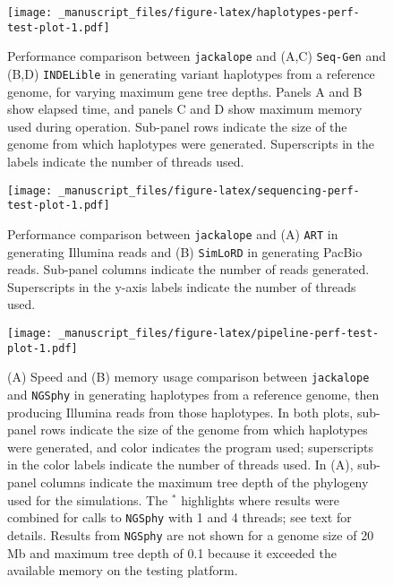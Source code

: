 \documentclass[12pt,]{article}
\begin{document}
\begin{figure}
\centering
\texttt{[image: \_manuscript\_files/figure-latex/haplotypes-perf-test-plot-1.pdf]}
\caption{\label{fig:haplotypes-perf-test-plot}Performance comparison between \texttt{jackalope} and (A,C) \texttt{Seq-Gen} and (B,D) \texttt{INDELible} in generating variant haplotypes from a reference genome, for varying maximum gene tree depths. Panels A and B show elapsed time, and panels C and D show maximum memory used during operation. Sub-panel rows indicate the size of the genome from which haplotypes were generated. Superscripts in the labels indicate the number of threads used.}
\end{figure}

\begin{figure}
\centering
\texttt{[image: \_manuscript\_files/figure-latex/sequencing-perf-test-plot-1.pdf]}
\caption{\label{fig:sequencing-perf-test-plot}Performance comparison between \texttt{jackalope} and (A) \texttt{ART} in generating Illumina reads and (B) \texttt{SimLoRD} in generating PacBio reads. Sub-panel columns indicate the number of reads generated. Superscripts in the y-axis labels indicate the number of threads used.}
\end{figure}

\begin{figure}
\centering
\texttt{[image: \_manuscript\_files/figure-latex/pipeline-perf-test-plot-1.pdf]}
\caption{\label{fig:pipeline-perf-test-plot}(A) Speed and (B) memory usage comparison between \texttt{jackalope} and \texttt{NGSphy} in generating haplotypes from a reference genome, then producing Illumina reads from those haplotypes. In both plots, sub-panel rows indicate the size of the genome from which haplotypes were generated, and color indicates the program used; superscripts in the color labels indicate the number of threads used. In (A), sub-panel columns indicate the maximum tree depth of the phylogeny used for the simulations. The \({}^{*}\) highlights where results were combined for calls to \texttt{NGSphy} with 1 and 4 threads; see text for details. Results from \texttt{NGSphy} are not shown for a genome size of 20 Mb and maximum tree depth of 0.1 because it exceeded the available memory on the testing platform.}
\end{figure}
\end{document}
